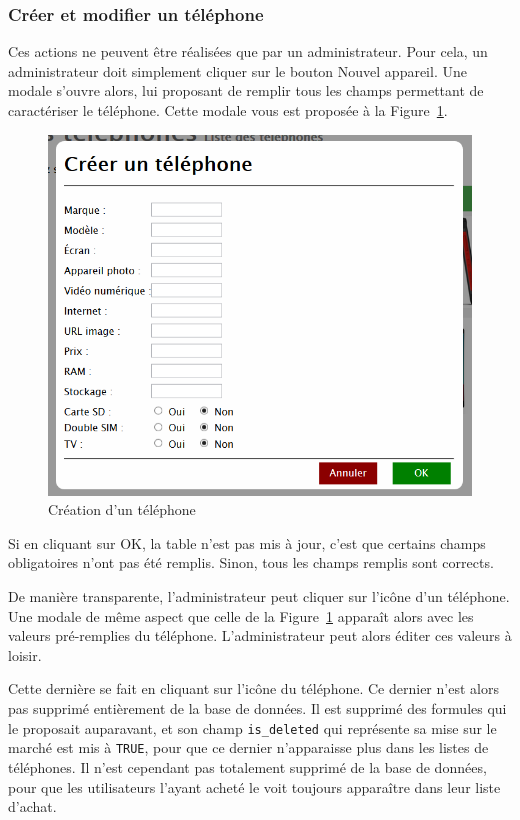 \subsubsection{Créer et modifier un téléphone}
Ces actions ne peuvent être réalisées que par un administrateur.
Pour cela, un administrateur doit simplement cliquer sur le bouton \og Nouvel appareil\fg. Une modale s'ouvre alors, lui proposant de remplir tous les champs permettant de caractériser le téléphone. Cette modale vous est proposée à la Figure~\ref{fig:new-phone}.

\begin{figure}[ht]
  \centering
  \includegraphics[width=.5\textwidth]{images/Plateforme/new_phone}
  \caption{Création d'un téléphone}
  \label{fig:new-phone}
\end{figure}

Si en cliquant sur \og OK\fg, la table n'est pas mis à jour, c'est que certains champs obligatoires n'ont pas été remplis. Sinon, tous les champs remplis sont corrects.

De manière transparente, l'administrateur peut cliquer sur l'icône \vColor{\faEdit} d'un téléphone. Une modale de même aspect que celle de la Figure~\ref{fig:new-phone} apparaît alors avec les valeurs pré-remplies du téléphone. L'administrateur peut alors éditer ces valeurs à loisir.

Cette dernière se fait en cliquant sur l'icône \thColor{\faRemove} du téléphone. Ce dernier n'est alors pas supprimé entièrement de la base de données. Il est supprimé des formules qui le proposait auparavant, et son champ \texttt{is\_deleted} qui représente sa mise sur le marché est mis à \texttt{TRUE}, pour que ce dernier n'apparaisse plus dans les listes de téléphones. Il n'est cependant pas totalement supprimé de la base de données, pour que les utilisateurs l'ayant acheté le voit toujours apparaître dans leur liste d'achat.


